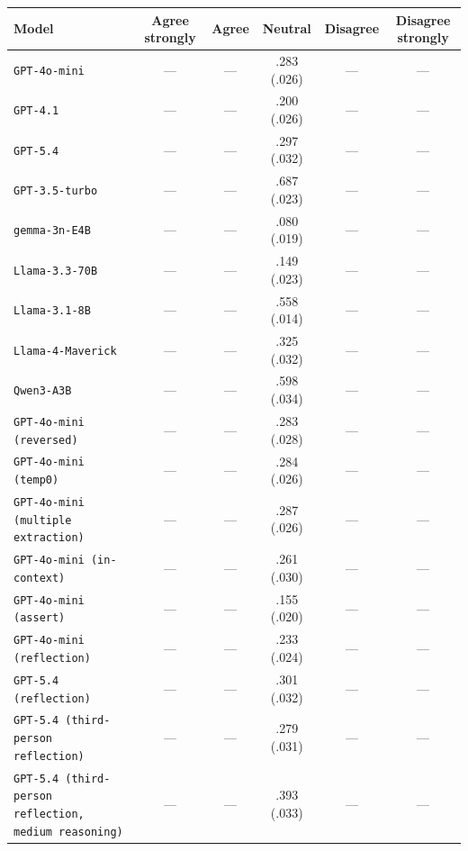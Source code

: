 \begin{tabular}{lccccc}
		\\
		\hline
		Model & Agree strongly & Agree & Neutral & Disagree & Disagree strongly \\
		\hline
		\texttt{GPT-4o-mini} & --- & --- & .283 (.026) & --- & --- \\
		\texttt{GPT-4.1} & --- & --- & .200 (.026) & --- & --- \\
		\texttt{GPT-5.4} & --- & --- & .297 (.032) & --- & --- \\
		\texttt{GPT-3.5-turbo} & --- & --- & .687 (.023) & --- & --- \\
		\texttt{gemma-3n-E4B} & --- & --- & .080 (.019) & --- & --- \\
		\texttt{Llama-3.3-70B} & --- & --- & .149 (.023) & --- & --- \\
		\texttt{Llama-3.1-8B} & --- & --- & .558 (.014) & --- & --- \\
		\texttt{Llama-4-Maverick} & --- & --- & .325 (.032) & --- & --- \\
		\texttt{Qwen3-A3B} & --- & --- & .598 (.034) & --- & --- \\
		\texttt{GPT-4o-mini (reversed)} & --- & --- & .283 (.028) & --- & --- \\
		\texttt{GPT-4o-mini (temp0)} & --- & --- & .284 (.026) & --- & --- \\
		\texttt{GPT-4o-mini (multiple extraction)} & --- & --- & .287 (.026) & --- & --- \\
		\texttt{GPT-4o-mini (in-context)} & --- & --- & .261 (.030) & --- & --- \\
		\texttt{GPT-4o-mini (assert)} & --- & --- & .155 (.020) & --- & --- \\
		\texttt{GPT-4o-mini (reflection)} & --- & --- & .233 (.024) & --- & --- \\
		\texttt{GPT-5.4 (reflection)} & --- & --- & .301 (.032) & --- & --- \\
		\texttt{GPT-5.4 (third-person reflection)} & --- & --- & .279 (.031) & --- & --- \\
		\texttt{GPT-5.4 (third-person reflection, medium reasoning)} & --- & --- & .393 (.033) & --- & --- \\
		\hline
\end{tabular}

